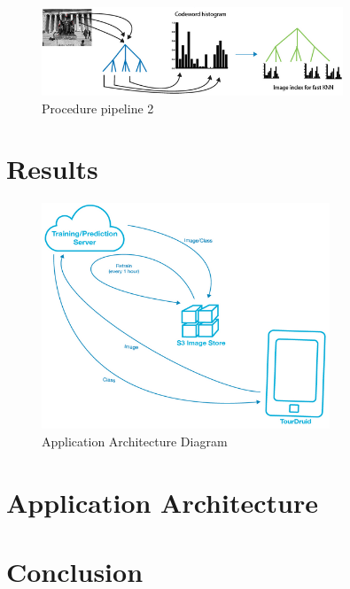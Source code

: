 \documentclass[twocolumn]{article}
\newcommand{\sectionfile}[3]{\section{#1} \label{sec:#2} }
\begin{document}
\begin{figure}
\includegraphics[width=90mm]{procedure2.png}
\caption{Procedure pipeline 2}
\label{overflow}

\end{figure}
\sectionfile{Results}{results}{results.tex}

\begin{figure}
\includegraphics[width=86mm]{app_arch.png}

\caption{Application Architecture Diagram}
\label{overflow}

\end{figure}
\sectionfile{Application Architecture}{application_architecture}{application_architecture.tex}
\sectionfile{Conclusion}{conclusion}{conclusion.tex}

\nocite{*}
{\small


}
\end{document}
